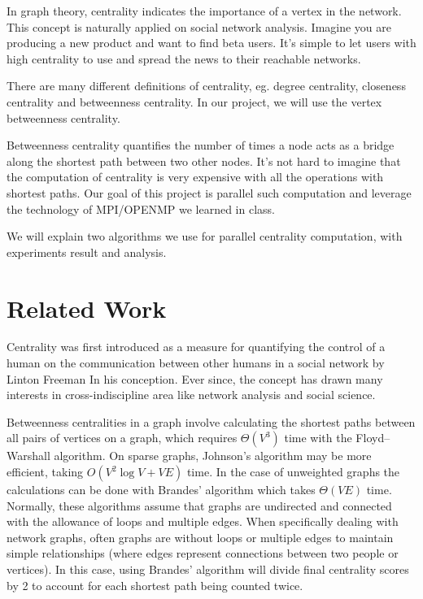 \documentclass[11pt,a4paper,titlepage]{article}
\begin{document}
In graph theory, centrality indicates the importance of a vertex in the
network. This concept is naturally applied on social network analysis. Imagine
you are producing a new product and want to find beta users. It's simple to let
users with high centrality to use and spread the news to their reachable
networks.

There are many different definitions of centrality, eg. degree centrality,
closeness centrality and betweenness centrality. In our project, we will use
the vertex betweenness centrality.

Betweenness centrality quantifies the number of times a node acts as a bridge
along the shortest path between two other nodes. It's not hard to imagine that
the computation of centrality is very expensive with all the operations with
shortest paths. Our goal of this project is parallel such computation and
leverage the technology of MPI/OPENMP we learned in class.

We will explain two algorithms we use for parallel centrality computation, with
experiments result and analysis. 



\section{Related Work} %
\label{sec:related-work}

Centrality was first introduced as a measure for quantifying the control of a
human on the communication between other humans in a social network by Linton
Freeman\cite{burt2009structural} In his conception. Ever since, the concept has
drawn many interests in cross-indiscipline area like network analysis and
social science.

Betweenness centralities in a graph involve calculating the shortest paths
between all pairs of vertices on a graph, which requires $\Theta(V^3)$ time
with the Floyd–Warshall\cite{Cormen:2001:IA:580470} algorithm. On sparse
graphs, Johnson's\cite{johnson1977efficient} algorithm may be more efficient,
taking $O(V^2 \log V + V E)$ time. In the case of unweighted graphs the
calculations can be done with Brandes' algorithm\cite{brandes2001faster} which
takes $\Theta(VE)$ time. Normally, these algorithms assume that graphs are
undirected and connected with the allowance of loops and multiple edges. When
specifically dealing with network graphs, often graphs are without loops or
multiple edges to maintain simple relationships (where edges represent
connections between two people or vertices). In this case, using Brandes'
algorithm will divide final centrality scores by 2 to account for each shortest
path being counted twice.
\end{document}
